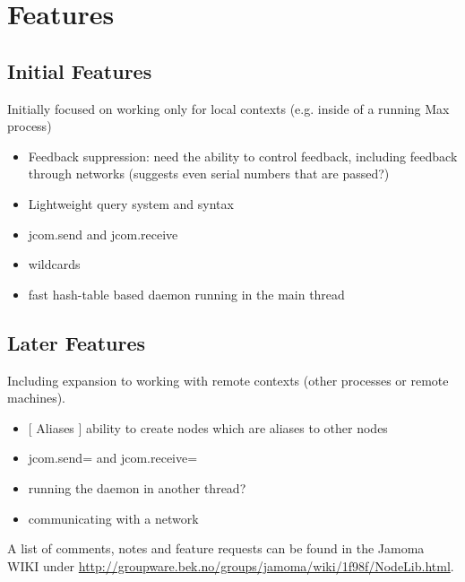 \documentclass[]{article}
\begin{document}
\section{Features}

\subsection{Initial Features}

Initially focused on working only for local contexts (e.g. inside of a running Max process)

\begin{itemize}
	
	\item Feedback suppression: need the ability to control feedback, including feedback through networks (suggests even serial numbers that are passed?)

	\item Lightweight query system and syntax

	\item jcom.send and jcom.receive

	\item wildcards

	\item fast hash-table based daemon running in the main thread

\end{itemize}


\subsection{Later Features}

Including expansion to working with remote contexts (other processes or remote machines). 

\begin{itemize}

	\item {[ Aliases ] ability to create nodes which are aliases to other nodes}

	\item {jcom.send= and jcom.receive=}

	\item {running the daemon in another thread?}

	\item {communicating with a network}

\end{itemize}

A list of comments, notes and feature requests can be found in the Jamoma WIKI under \url{http://groupware.bek.no/groups/jamoma/wiki/1f98f/NodeLib.html}. 





\end{document}
